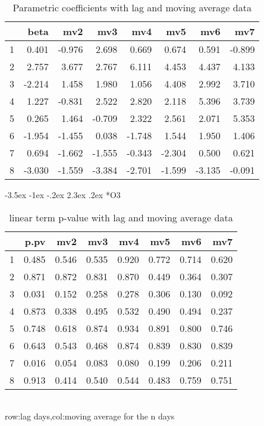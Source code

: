 \documentclass[a4paper, 12pt]{article}
\makeatletter
\def\large{\fontsize{14}{20}\selectfont}
\renewcommand\subsection{\@startsection {subsection}{1}{\z@}%
                                   {-3.5ex \@plus -1ex \@minus -.2ex}%
                                   {2.3ex \@plus.2ex}%
                                   {\centering\normalfont\large\bfseries}}
\makeatother
\begin{document}
\begin{table}[h]
\centering
\caption{Parametric coefficients with lag and moving average data}
\begin{tabular}{rrrrrrrr}
  \hline
 & beta & mv2 & mv3 & mv4 & mv5 & mv6 & mv7 \\
  \hline
1 & 0.401 & -0.976 & 2.698 & 0.669 & 0.674 & 0.591 & -0.899 \\
  2 & 2.757 & 3.677 & 2.767 & 6.111 & 4.453 & 4.437 & 4.133 \\
  3 & -2.214 & 1.458 & 1.980 & 1.056 & 4.408 & 2.992 & 3.710 \\
  4 & 1.227 & -0.831 & 2.522 & 2.820 & 2.118 & 5.396 & 3.739 \\
  5 & 0.265 & 1.464 & -0.709 & 2.322 & 2.561 & 2.071 & 5.353 \\
  6 & -1.954 & -1.455 & 0.038 & -1.748 & 1.544 & 1.950 & 1.406 \\
  7 & 0.694 & -1.662 & -1.555 & -0.343 & -2.304 & 0.500 & 0.621 \\
  8 & -3.030 & -1.559 & -3.384 & -2.701 & -1.599 & -3.135 & -0.091 \\
   \hline
\end{tabular}
\end{table}
\clearpage
\subsection*{O3}
\begin{table}[h]
\centering
\caption{linear term p-value with lag and moving average data}
\begin{tabular}{rrrrrrrr}
  \hline
 & p.pv & mv2 & mv3 & mv4 & mv5 & mv6 & mv7 \\
  \hline
1 & 0.485 & 0.546 & 0.535 & 0.920 & 0.772 & 0.714 & 0.620 \\
  2 & 0.871 & 0.872 & 0.831 & 0.870 & 0.449 & 0.364 & 0.307 \\
  3 & 0.031 & 0.152 & 0.258 & 0.278 & 0.306 & 0.130 & 0.092 \\
  4 & 0.873 & 0.338 & 0.495 & 0.532 & 0.490 & 0.494 & 0.237 \\
  5 & 0.748 & 0.618 & 0.874 & 0.934 & 0.891 & 0.800 & 0.746 \\
  6 & 0.643 & 0.543 & 0.468 & 0.874 & 0.839 & 0.830 & 0.839 \\
  7 & 0.016 & 0.054 & 0.083 & 0.080 & 0.199 & 0.206 & 0.211 \\
  8 & 0.913 & 0.414 & 0.540 & 0.544 & 0.483 & 0.759 & 0.751 \\
   \hline
\end{tabular}
\\row:lag days,col:moving average for the n days
\end{table}
\end{document}
